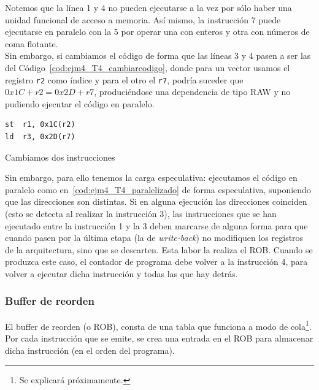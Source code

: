 \begin{ejemplo}
    Notemos que la línea 1 y 4 no pueden ejecutarse a la vez por sólo haber una unidad funcional de acceso a memoria. Así mismo, la instrucción 7 puede ejecutarse en paralelo con la 5 por operar una con enteros y otra con números de coma flotante.\\
    
    Sin embargo, si cambiamos el código de forma que las líneas 3 y 4 pasen a ser las del Código~\ref{cod:ejm4_T4_cambiarcodigo}, donde para un vector usamos el registro \verb|r2| como índice y para el otro el \verb|r7|, podría suceder que $0x1C + r2 = 0x2D + r7$, produciéndose una dependencia de tipo RAW y no pudiendo ejecutar el código en paralelo.
    \begin{listing}[H]
    \begin{verbatim}
st  r1, 0x1C(r2)
ld  r3, 0x2D(r7)
    \end{verbatim}
    \caption{Cambiamos dos instrucciones}
    \label{cod:ejm4_T4_cambiarcodigo}
    \end{listing}
    Sin embargo, para ello tenemos la carga especulativa: ejecutamos el código en paralelo como en~\ref{cod:ejm4_T4_paralelizado} de forma especulativa, suponiendo que las direcciones son distintas. Si en alguna ejecución las direcciones coinciden (esto se detecta al realizar la instrucción 3), las instrucciones que se han ejecutado entre la instrucción 1 y la 3 deben marcarse de alguna forma para que cuando pasen por la última etapa (la de \emph{write-back}) no modifiquen los registros de la arquitectura, sino que se descarten. Esta labor la realiza el ROB\@. Cuando se produzca este caso, el contador de programa debe volver a la instrucción 4, para volver a ejecutar dicha instrucción y todas las que hay detrás.
\end{ejemplo}

\subsubsection{Buffer de reorden}
El buffer de reorden (o ROB), consta de una tabla que funciona a modo de cola\footnote{Se explicará próximamente.}. Por cada instrucción que se emite, se crea una entrada en el ROB para almacenar dicha instrucción (en el orden del programa).

